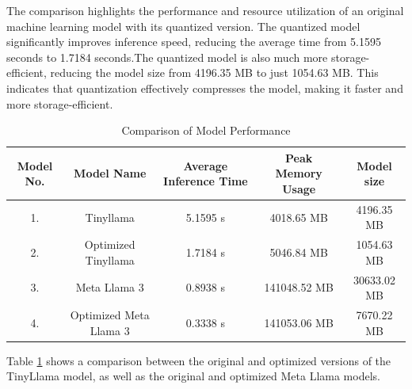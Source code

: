 \documentclass{josis}
\begin{document}
The comparison highlights the performance and resource utilization of an original machine learning model with its quantized version. The quantized model significantly improves inference speed, reducing the average time from 5.1595 seconds to 1.7184 seconds.The quantized model is also much more storage-efficient, reducing the model size from 4196.35 MB to just 1054.63 MB. This indicates that quantization effectively compresses the model, making it faster and more storage-efficient.
\begin{table}
\centering
\begin{tabular}{|c|c|c|c|c|}
\hline
Model No. & Model Name & Average Inference Time & Peak Memory Usage & Model size \\
\hline
1. & Tinyllama & 5.1595 s & 4018.65 MB & 4196.35 MB \\
\hline
2. & Optimized Tinyllama & 1.7184 s & 5046.84 MB & 1054.63 MB \\
\hline
3.& Meta Llama 3 & 0.8938 s & 141048.52 MB & 30633.02 MB \\
\hline
4.& Optimized Meta Llama 3 & 0.3338 s & 141053.06 MB & 7670.22 MB \\
\hline
\end{tabular}
\caption{Comparison of Model Performance}
\label{tab:model-comparison}
\end{table}

Table \ref{tab:model-comparison} shows a comparison between the original and optimized versions of the TinyLlama model, as well as the original and optimized Meta Llama models.
\end{document}
